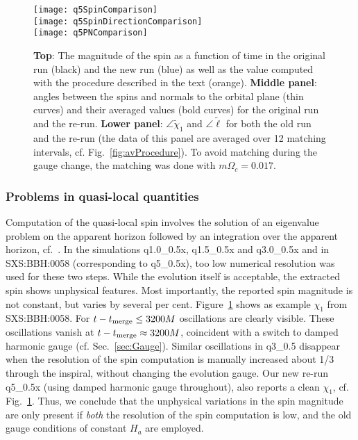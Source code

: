 \documentclass[aps,prd,amsmath,floatfix,twocolumn,superscriptaddress,nofootinbib,showpacs]{revtex4-1}
\begin{document}
\begin{figure}
\hfill    \texttt{[image: q5SpinComparison]}\\
\hfill    \texttt{[image: q5SpinDirectionComparison]}\\
\hfill\texttt{[image: q5PNComparison]}
\caption{{\bf Top}: The magnitude of the spin as a function of time in
  the original run (black) and the new run (blue) as well as the value
  computed with the procedure described in the text (orange). {\bf
    Middle panel}: angles between the spins and normals to the orbital
  plane (thin curves) and their averaged values (bold curves) for the
  original run and the re-run.  {\bf Lower panel}: $\angle
  \tilde{\chi}_{1}$ and $\angle \tilde{\ell}$ for both the old run and
  the re-run (the data of this panel are averaged over 12 matching
  intervals, cf. Fig.~\ref{fig:avProcedure}). To avoid matching during
  the gauge change, the matching was done with $m\Omega_{c}=0.017$.}
    \label{fig:q5SpinComparison}
  \end{figure}


\subsubsection{Problems in quasi-local quantities}
\label{sec:AH-resolution}




Computation of the quasi-local spin involves the solution of an
eigenvalue problem on the apparent horizon followed by an integration
over the apparent horizon,
cf.~\cite{Lovelace2008,OwenThesis,Cook2007}.  In the simulations
q1.0\_0.5x, q1.5\_0.5x and q3.0\_0.5x and in SXS:BBH:0058
(corresponding to q5\_0.5x), too low numerical resolution was used for
these two steps.  While the evolution itself is acceptable, the
extracted spin shows unphysical features.  Most importantly, the
reported spin magnitude is not constant, but varies by several per
cent.  Figure~\ref{fig:q5SpinComparison} shows as example $\chi_1$
from SXS:BBH:0058.  For $t-t_{\rm merge}\le 3200M$ oscillations are
clearly visible.  These oscillations vanish at $t-t_{\rm merge}\approx
3200M$, coincident with a switch to damped harmonic gauge
(cf. Sec.~\ref{sec:Gauge}).  Similar oscillations in q3\_0.5 disappear
when the resolution of the spin computation is manually increased
about 1/3 through the inspiral, without changing the evolution gauge.
Our new re-run q5\_0.5x (using damped harmonic gauge throughout), also
reports a clean $\chi_1$, cf. Fig.~\ref{fig:q5SpinComparison}.  Thus,
we conclude that the unphysical variations in the spin magnitude are
only present if \emph{both} the resolution of the spin computation is
low, and the old gauge conditions of constant $H_a$ are employed.
\end{document}
